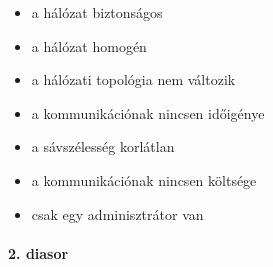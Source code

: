 \documentclass[twoside, a4paper, 12pt]{article}
\begin{document}
\begin{description}
\begin{itemize}
                \item a hálózat biztonságos
                \item a hálózat homogén
                \item a hálózati topológia nem változik
                \item a kommunikációnak nincsen időigénye
                \item a sávszélesség korlátlan
                \item a kommunikációnak nincsen költsége
                \item csak egy adminisztrátor van
            \end{itemize}
    \end{description}
    \paragraph{2. diasor}
\end{document}
